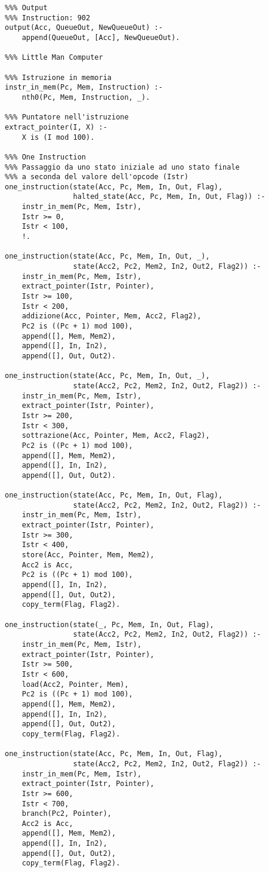 \documentclass[a4paper,12pt, oneside]{book}
\begin{document}
\begin{verbatim}
%%% Output
%%% Instruction: 902
output(Acc, QueueOut, NewQueueOut) :- 
    append(QueueOut, [Acc], NewQueueOut).

%%% Little Man Computer

%%% Istruzione in memoria
instr_in_mem(Pc, Mem, Instruction) :- 
    nth0(Pc, Mem, Instruction, _).

%%% Puntatore nell'istruzione
extract_pointer(I, X) :- 
    X is (I mod 100).

%%% One Instruction
%%% Passaggio da uno stato iniziale ad uno stato finale
%%% a seconda del valore dell'opcode (Istr)
one_instruction(state(Acc, Pc, Mem, In, Out, Flag), 
                halted_state(Acc, Pc, Mem, In, Out, Flag)) :- 
    instr_in_mem(Pc, Mem, Istr),
    Istr >= 0,
    Istr < 100,
    !.

one_instruction(state(Acc, Pc, Mem, In, Out, _), 
                state(Acc2, Pc2, Mem2, In2, Out2, Flag2)) :- 
    instr_in_mem(Pc, Mem, Istr),
    extract_pointer(Istr, Pointer),
    Istr >= 100,
    Istr < 200,
    addizione(Acc, Pointer, Mem, Acc2, Flag2),
    Pc2 is ((Pc + 1) mod 100),
    append([], Mem, Mem2),
    append([], In, In2),
    append([], Out, Out2).

one_instruction(state(Acc, Pc, Mem, In, Out, _), 
                state(Acc2, Pc2, Mem2, In2, Out2, Flag2)) :- 
    instr_in_mem(Pc, Mem, Istr),
    extract_pointer(Istr, Pointer),
    Istr >= 200,
    Istr < 300,
    sottrazione(Acc, Pointer, Mem, Acc2, Flag2),
    Pc2 is ((Pc + 1) mod 100),
    append([], Mem, Mem2),
    append([], In, In2),
    append([], Out, Out2).

one_instruction(state(Acc, Pc, Mem, In, Out, Flag), 
                state(Acc2, Pc2, Mem2, In2, Out2, Flag2)) :- 
    instr_in_mem(Pc, Mem, Istr),
    extract_pointer(Istr, Pointer),
    Istr >= 300,
    Istr < 400,
    store(Acc, Pointer, Mem, Mem2),
    Acc2 is Acc,
    Pc2 is ((Pc + 1) mod 100),
    append([], In, In2),
    append([], Out, Out2),
    copy_term(Flag, Flag2).

one_instruction(state(_, Pc, Mem, In, Out, Flag), 
                state(Acc2, Pc2, Mem2, In2, Out2, Flag2)) :- 
    instr_in_mem(Pc, Mem, Istr),
    extract_pointer(Istr, Pointer),
    Istr >= 500,
    Istr < 600,
    load(Acc2, Pointer, Mem),                                   
    Pc2 is ((Pc + 1) mod 100),
    append([], Mem, Mem2),
    append([], In, In2),
    append([], Out, Out2),
    copy_term(Flag, Flag2).

one_instruction(state(Acc, Pc, Mem, In, Out, Flag), 
                state(Acc2, Pc2, Mem2, In2, Out2, Flag2)) :- 
    instr_in_mem(Pc, Mem, Istr),
    extract_pointer(Istr, Pointer),
    Istr >= 600,
    Istr < 700,
    branch(Pc2, Pointer),
    Acc2 is Acc,
    append([], Mem, Mem2),
    append([], In, In2),
    append([], Out, Out2),
    copy_term(Flag, Flag2).


\end{verbatim}
\end{document}
